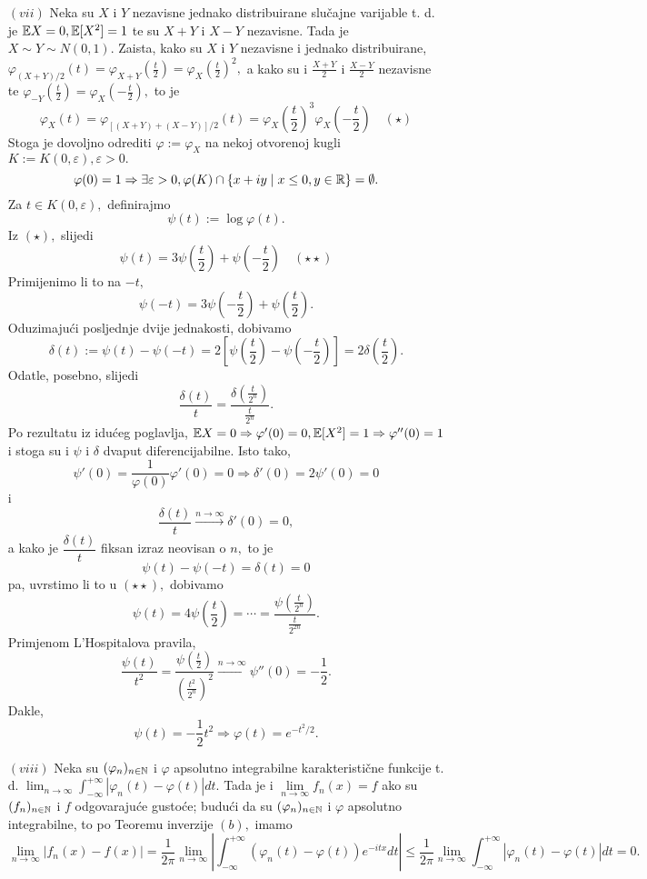 \documentclass{article}
\begin{document}
\begin{enumerate}
    \item[\((vii)\)] Neka su \(X\) i \(Y\) nezavisne jednako distribuirane slučajne varijable t. d. je \(\Bbb EX=0,\Bbb E[X^2]=1\) te su \(X+Y\) i \(X-Y\) nezavisne. Tada je \(X\sim Y\sim N(0,1).\) Zaista, kako su \(X\) i \(Y\) nezavisne i jednako distribuirane, \(\varphi_{(X+Y)/2}(t)=\varphi_{X+Y}\left(\frac{t}2\right)=\varphi_X\left(\frac{t}2\right)^2,\) a kako su i \(\frac{X+Y}2\) i \(\frac{X-Y}2\) nezavisne te \(\varphi_{-Y}\left(\frac{t}2\right)=\varphi_X\left(-\frac{t}2\right),\) to je \[\varphi_X(t)=\varphi_{[(X+Y)+(X-Y)]/2}(t)=\varphi_X\left(\frac{t}2\right)^3\varphi_X\left(-\frac{t}2\right)\quad(\star)\] Stoga je dovoljno odrediti \(\varphi:=\varphi_X\) na nekoj otvorenoj kugli \(K:=K(0,\varepsilon),\varepsilon>0.\) \[\varphi(0)=1\Rightarrow\exists\varepsilon>0,\varphi(K)\cap\{x+iy\mid x\le0,y\in\Bbb R\}=\emptyset.\] Za \(t\in K(0,\varepsilon),\) definirajmo \[\psi(t):=\log\varphi(t).\] Iz \((\star),\) slijedi \[\psi(t)=3\psi\left(\frac{t}2\right)+\psi\left(-\frac{t}2\right)\quad(\star\star)\] Primijenimo li to na \(-t,\) \[\psi(-t)=3\psi\left(-\frac{t}2\right)+\psi\left(\frac{t}2\right).\] Oduzimajući posljednje dvije jednakosti, dobivamo \[\delta(t):=\psi(t)-\psi(-t)=2\left[\psi\left(\frac{t}2\right)-\psi\left(-\frac{t}2\right)\right]=2\delta\left(\frac{t}2\right).\] Odatle, posebno, slijedi \[\frac{\delta(t)}t=\frac{\delta\left(\frac{t}{2^n}\right)}{\frac{t}{2^n}}.\] Po rezultatu iz idućeg poglavlja, \(\Bbb EX=0\Rightarrow\varphi'(0)=0,\Bbb E[X^2]=1\Rightarrow\varphi''(0)=1\) i stoga su i \(\psi\) i \(\delta\) dvaput diferencijabilne. Isto tako, \[\psi'(0)=\frac1{\varphi(0)}\varphi'(0)=0\Rightarrow\delta'(0)=2\psi'(0)=0\] i \[\frac{\delta(t)}{t}\overset{n\to\infty}{\longrightarrow}\delta'(0)=0,\] a kako je \(\dfrac{\delta(t)}{t}\) fiksan izraz neovisan o \(n,\) to je \[\psi(t)-\psi(-t)=\delta(t)=0\] pa, uvrstimo li to u \((\star\star),\) dobivamo \[\psi(t)=4\psi\left(\frac{t}2\right)=\cdots=\frac{\psi\left(\frac{t}{2^n}\right)}{\frac{t}{2^{2n}}}.\] Primjenom L'Hospitalova pravila, \[\frac{\psi(t)}{t^2}=\frac{\psi\left(\frac{t}2\right)}{\left(\frac{t^2}{2^n}\right)^2}\overset{n\to\infty}{\longrightarrow}\psi''(0)=-\frac12.\] Dakle, \[\psi(t)=-\frac12t^2\Rightarrow\varphi(t)=e^{-t^2/2}.\] 
    \item[\((viii)\)] Neka su \((\varphi_n)_{n\in\Bbb N}\) i \(\varphi\) apsolutno integrabilne karakteristične funkcije t. d. \(\displaystyle\lim_{n\to\infty}\int_{-\infty}^{+\infty}|\varphi_n(t)-\varphi(t)|dt.\) Tada je i \(\lim\limits_{n\to\infty}f_n(x)=f\) ako su \((f_n)_{n\in\Bbb N}\) i \(f\) odgovarajuće gustoće; budući da su \((\varphi_n)_{n\in\Bbb N}\) i \(\varphi\) apsolutno integrabilne, to po Teoremu inverzije \((b),\) imamo \[\lim_{n\to\infty}|f_n(x)-f(x)|=\frac1{2\pi}\lim_{n\to\infty}\left|\int_{-\infty}^{+\infty}(\varphi_n(t)-\varphi(t))e^{-itx}dt\right|\le\frac1{2\pi}\lim_{n\to\infty}\int_{-\infty}^{+\infty}\left|\varphi_n(t)-\varphi(t)\right|dt=0.\]
\end{enumerate}
\end{document}
